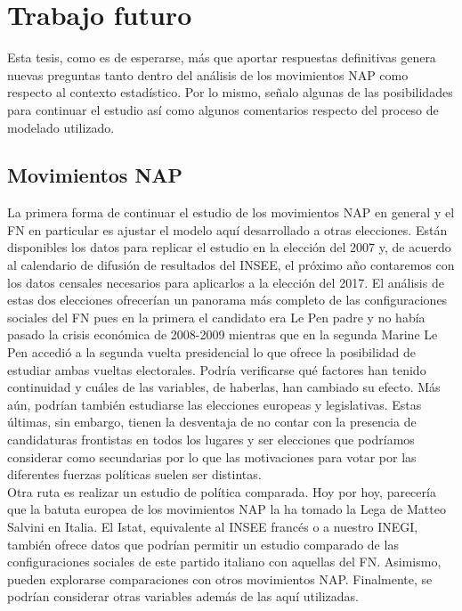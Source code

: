 \section*{Trabajo futuro}

Esta tesis, como es de esperarse, más que aportar respuestas definitivas genera nuevas preguntas tanto dentro del análisis de los movimientos NAP como respecto al contexto estadístico. Por lo mismo, señalo algunas de las posibilidades para continuar el estudio así como algunos comentarios respecto del proceso de modelado utilizado.

\subsection*{Movimientos NAP}

La primera forma de continuar el estudio de los movimientos NAP en general y el FN en particular es ajustar el modelo aquí desarrollado a otras elecciones. Están disponibles los datos para replicar el estudio en la elección del 2007 y, de acuerdo al calendario de difusión de resultados del INSEE, el próximo año contaremos con los datos censales necesarios para aplicarlos a la elección del 2017. El análisis de estas dos elecciones ofrecerían un panorama más completo de las configuraciones sociales del FN pues en la primera el candidato era Le Pen padre y no había pasado la crisis económica de 2008-2009 mientras que en la segunda Marine Le Pen accedió a la segunda vuelta presidencial lo que ofrece la posibilidad de estudiar ambas vueltas electorales. Podría verificarse qué factores han tenido continuidad y cuáles de las variables, de haberlas, han cambiado su efecto. Más aún, podrían también estudiarse las elecciones europeas y legislativas. Estas últimas, sin embargo, tienen la desventaja de no contar con la presencia de candidaturas frontistas en todos los lugares y ser elecciones que podríamos considerar como secundarias por lo que las motivaciones para votar por las diferentes fuerzas políticas suelen ser distintas.\\

Otra ruta es realizar un estudio de política comparada. Hoy por hoy, parecería que la batuta europea de los movimientos NAP la ha tomado la Lega de Matteo Salvini en Italia. El Istat, equivalente al INSEE francés o a nuestro INEGI, también ofrece datos que podrían permitir un estudio comparado de las configuraciones sociales de este partido italiano con aquellas del FN. Asimismo, pueden explorarse comparaciones con otros movimientos NAP. Finalmente, se podrían considerar otras variables además de las aquí utilizadas.

